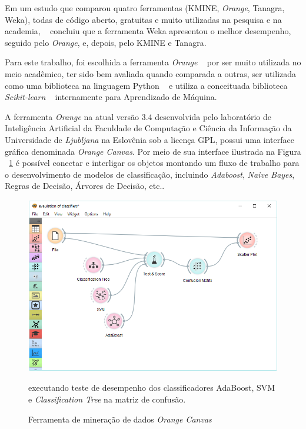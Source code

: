 Em um estudo que comparou quatro ferramentas (KMINE, \textit{Orange}, Tanagra, Weka), todas de código aberto, gratuitas e muito utilizadas na pesquisa e na academia, ~\cite{wahbeh2011comparison} concluiu que a ferramenta Weka apresentou o melhor desempenho, seguido pelo \textit{Orange}, e, depois, pelo KMINE e Tanagra.

Para este trabalho, foi escolhida a ferramenta \textit{Orange} ~\cite{JMLR:demsar13a} por ser muito utilizada no meio acadêmico, ter sido bem avaliada quando comparada a outras, ser utilizada como uma biblioteca na linguagem Python ~\cite{van2003python} e utiliza a conceituada biblioteca \textit{Scikit-learn} ~\cite{scikit-learn} internamente para Aprendizado de Máquina. 

A ferramenta \textit{Orange} na atual versão 3.4 desenvolvida pelo laboratório de Inteligência Artificial da Faculdade de Computação e Ciência da Informação da Universidade de \textit{Ljubljana} na Eslovênia sob a licença GPL, possui uma interface gráfica denominada \textit{Orange Canvas}. Por meio de sua interface ilustrada na Figura ~\ref{fig:orange_canvas} é possível conectar e interligar os objetos montando um fluxo de trabalho para o desenvolvimento de modelos de classificação, incluindo \textit{Adaboost}, \textit{Naive Bayes}, Regras de Decisão, Árvores de Decisão, etc..

\begin{figure}[H]
\begin{center}
    \includegraphics[scale=0.55]{images/orange_canvas.png}
\end{center}
\caption{Ferramenta de mineração de dados \textit{Orange Canvas}} executando teste de desempenho dos classificadores AdaBoost, SVM e \textit{Classification Tree} na matriz de confusão.  
\label{fig:orange_canvas}
\end{figure}

